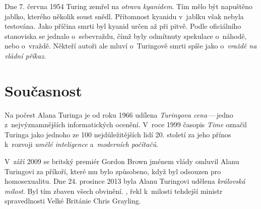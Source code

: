 \documentclass[a4paper, 11pt]{article}
\begin{document}
Dne 7. června 1954 Turing zemřel na \emph{otravu kyanidem}. Tím mělo
být napuštěno jablko, kterého několik soust snědl. Přítomnost kyanidu v~jablku
však nebyla testována. Jako příčina smrti byl kyanid určen až při pitvě.
Podle oficiálního stanoviska se jednalo o~sebevraždu, čímž byly odmítnuty
spekulace o~náhodě, nebo o~vraždě. Někteří autoři ale mluví o~Turingově
smrti spíše jako o~\emph{vraždě na vládní příkaz}.


\section{Současnost}

Na počest Alana Turinga je od roku 1966 udílena \emph{Turingova
cena}\,---\,jedno z~nejvýznamnějších informatických ocenění. V~roce 1999
časopis \emph{Time} označil Turinga jako jednoho ze 100 nejdůležitějších
lidí 20. století za jeho přínos k~rozvoji \emph{umělé inteligence}
a~\emph{moderních počítačů}.

V~září 2009 se britský premiér Gordon Brown jménem vlády omluvil Alanu
Turingovi za příkoří, které mu bylo způsobeno, když byl odsouzen pro
homosexualitu. Dne 24. prosince 2013 byla Alanu Turingovi udělena
\emph{královská milost}. Byl tím zbaven všech obvinění. , řekl k~milosti
tehdejší ministr spravedlnosti Velké Británie Chris Grayling.
\end{document}
